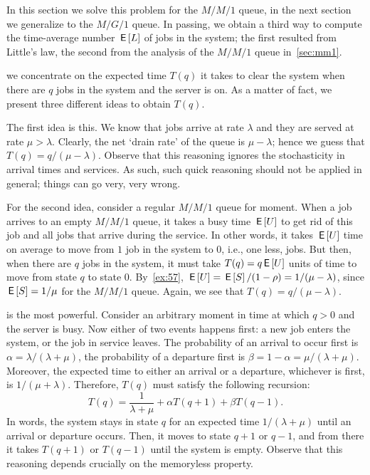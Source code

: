 In this section we solve this problem for the $M/M/1$ queue, in the next section we generalize to the $M/G/1$ queue.
In passing, we obtain a third way to compute the time-average number $\,\mathsf{E}\left[L\right]$ of jobs in the system; the first resulted from Little's law, the second from the analysis of the $M/M/1$ queue in~\cref{sec:mm1}.


 we concentrate on the expected time $T(q)$ it takes to clear the system when there are $q$ jobs in the system and the server is on.
As a matter of fact, we present three different ideas to obtain $T(q)$.

The first idea is this. We know that jobs arrive at rate $\lambda$ and they are served at rate $\mu>\lambda$.
Clearly, the net `drain rate' of the queue is $\mu-\lambda$; hence we guess that $T(q)=q/(\mu-\lambda)$.
Observe that this reasoning ignores the stochasticity in arrival times and services.
As such, such quick reasoning should not be applied in general; things can go very, very wrong.


For the second idea, consider a regular $M/M/1$ queue for moment.
When a job arrives to an empty $M/M/1$ queue, it takes a busy time $\,\mathsf{E}\left[U\right]$ to get rid of this job and all jobs that arrive during the service.
In other words, it takes $\,\mathsf{E}\left[U\right]$ time on average to move from $1$ job in the system to $0$, i.e., one less, jobs.
But then, when there are $q$ jobs in the system, it must take $T(q) = q\,\mathsf{E}\left[U\right]$ units of time to move from state $q$ to state $0$.
By~\cref{ex:57}, $\,\mathsf{E}\left[U\right]=\,\mathsf{E}\left[S\right]/(1-\rho)= 1/(\mu-\lambda)$, since $\,\mathsf{E}\left[S\right] = 1/\mu$ for the $M/M/1$ queue.
Again, we see that $T(q)=q/(\mu-\lambda)$.

 is the most powerful.
Consider an arbitrary moment in time at which $q>0$ and the server is busy.
Now either of two events happens first: a new job enters the system, or the job in service leaves.
The probability of an arrival to occur first is $\alpha=\lambda/(\lambda+\mu)$, the probability of a departure first is $\beta=1-\alpha = \mu/(\lambda+\mu)$.
Moreover, the expected time to either an arrival or a departure, whichever is first, is $1/(\mu+\lambda)$. Therefore, $T(q)$ must satisfy the following recursion:
\begin{equation}  \label{eq:92}
  T(q) =  \frac{1}{\lambda+\mu} + \alpha T(q+1) + \beta T(q-1).
\end{equation}
In words, the system stays in state $q$ for an expected time $1/(\lambda+\mu)$ until an arrival or departure occurs.
Then, it moves to state $q+1$ or $q-1$, and from there it takes $T(q+1)$ or $T(q-1)$ until the system is empty.
Observe that this reasoning depends crucially on the memoryless property.

